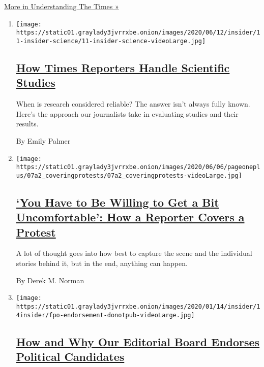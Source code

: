 \href{/series/understanding-the-times}{More in Understanding The Times
»}

\begin{enumerate}
\def\labelenumi{\arabic{enumi}.}
\item
  \texttt{[image: https://static01.graylady3jvrrxbe.onion/images/2020/06/12/insider/11-insider-science/11-insider-science-videoLarge.jpg]}

  \hypertarget{how-times-reporters-handle-scientific-studies}{%
  \subsection{\texorpdfstring{\href{/2020/06/09/insider/reporters-scientific-studies.html}{How
  Times Reporters Handle Scientific
  Studies}}{How Times Reporters Handle Scientific Studies}}\label{how-times-reporters-handle-scientific-studies}}

  When is research considered reliable? The answer isn't always fully
  known. Here's the approach our journalists take in evaluating studies
  and their results.

  By Emily Palmer
\item
  \texttt{[image: https://static01.graylady3jvrrxbe.onion/images/2020/06/06/pageoneplus/07a2\_coveringprotests/07a2\_coveringprotests-videoLarge.jpg]}

  \hypertarget{you-have-to-be-willing-to-get-a-bit-uncomfortable-how-a-reporter-covers-a-protest}{%
  \subsection{\texorpdfstring{\href{/2020/06/06/reader-center/covering-protests.html}{`You
  Have to Be Willing to Get a Bit Uncomfortable': How a Reporter Covers
  a
  Protest}}{`You Have to Be Willing to Get a Bit Uncomfortable': How a Reporter Covers a Protest}}\label{you-have-to-be-willing-to-get-a-bit-uncomfortable-how-a-reporter-covers-a-protest}}

  A lot of thought goes into how best to capture the scene and the
  individual stories behind it, but in the end, anything can happen.

  By Derek M. Norman
\item
  \texttt{[image: https://static01.graylady3jvrrxbe.onion/images/2020/01/14/insider/14insider/fpo-endorsement-donotpub-videoLarge.jpg]}

  \hypertarget{how-and-why-our-editorial-board-endorses-political-candidates}{%
  \subsection{\texorpdfstring{\href{/2020/01/13/reader-center/political-endorsements.html}{How
  and Why Our Editorial Board Endorses Political
  Candidates}}{How and Why Our Editorial Board Endorses Political Candidates}}\label{how-and-why-our-editorial-board-endorses-political-candidates}}


\end{enumerate}
